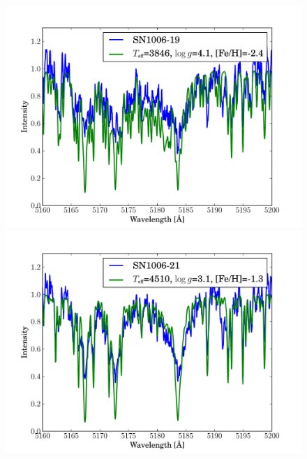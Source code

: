 \begin{figure}[tb]
   \label{fig:sn1006_candfit}
\end{figure}\begin{figure}[tb] %
   \centering
\includegraphics[width=1.1\textwidth, trim=0 0mm 0 10mm, clip]{chapter_sn1006/plots/gold_spectra/sn1006_19.pdf}
\includegraphics[width=1.1\textwidth, trim=0 0mm 0 10mm, clip]{chapter_sn1006/plots/gold_spectra/sn1006_21.pdf}


\end{figure}
